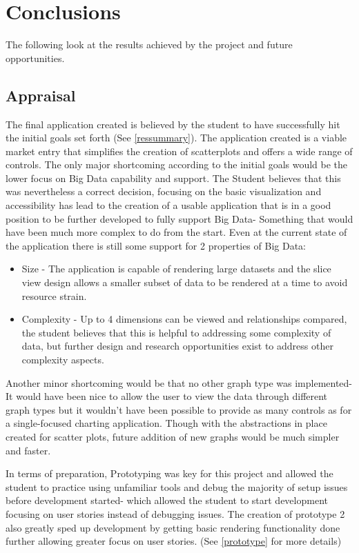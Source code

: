 \section{Conclusions}
The following look at the results achieved by the project and future opportunities.

\subsection{Appraisal}
The final application created is believed by the student to have successfully hit the initial goals set forth (See \ref{ressummary}). The application created is a viable market entry that simplifies the creation of scatterplots and offers a wide range of controls. The only major shortcoming according to the initial goals would be the lower focus on Big Data capability and support. The Student believes that this was nevertheless a correct decision, focusing on the basic visualization and accessibility has lead to the creation of a usable application that is in a good position to be further developed to fully support Big Data- Something that would have been much more complex to do from the start. Even at the current state of the application there is still some support for 2 properties \cite[]{6612229} of Big Data:
\begin{itemize}
    \item Size - The application is capable of rendering large datasets and the slice view design allows a smaller subset of data to be rendered at a time to avoid resource strain.
    \item Complexity -  Up to 4 dimensions can be viewed and relationships compared, the student believes that this is helpful to addressing some complexity of data, but further design and research opportunities exist to address other complexity aspects. \cite[]{6612229}
\end{itemize}

Another minor shortcoming would be that no other graph type was implemented- It would have been nice to allow the user to view the data through different graph types but it wouldn't have been possible to provide as many controls as for a single-focused charting application. Though with the abstractions in place created for scatter plots, future addition of new graphs would be much simpler and faster.

In terms of preparation, Prototyping was key for this project and allowed the student to practice using unfamiliar tools and debug the majority of setup issues before development started- which allowed the student to start development focusing on user stories instead of debugging issues. The creation of prototype 2 also greatly sped up development by getting basic rendering functionality done further allowing greater focus on user stories. (See \ref{prototype} for more details)

